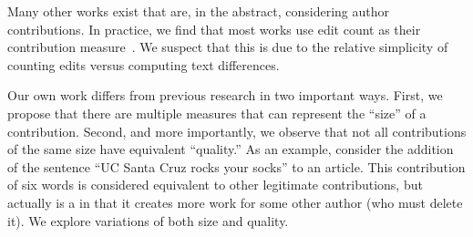 Many other works exist that are, in the abstract, considering
author contributions.  In practice, we find that most works
use edit count as their contribution
measure~\cite{Wilkinson2007,Burke2008,Suh2008,Ortega2007,Stein2007,Ortega2009}.
We suspect that this is due to the relative simplicity of
counting edits versus computing text differences.

Our own work differs from previous research in two important ways.
First, we propose that there are multiple measures that
can represent the ``size'' of a contribution.
Second, and more importantly, we observe that not all
contributions of the same size have equivalent ``quality.''
As an example, consider the addition of the sentence ``UC Santa
Cruz rocks your socks'' to an article.
This contribution of six words is considered equivalent to other
legitimate contributions, but actually is a 
in that it creates more work for some other author (who must delete it).
We explore variations of both size and quality.

